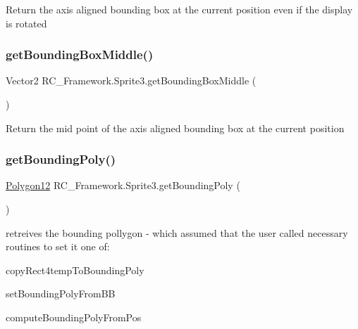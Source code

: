 Return the axis aligned bounding box at the current position even if the display is rotated 

\mbox{\label{class_r_c___framework_1_1_sprite3_a01208614a05673dd6b6d747910394657}} 
\subsubsection{\texorpdfstring{get\+Bounding\+Box\+Middle()}{getBoundingBoxMiddle()}}
{\footnotesize\ttfamily Vector2 R\+C\+\_\+\+Framework.\+Sprite3.\+get\+Bounding\+Box\+Middle (\begin{DoxyParamCaption}{ }\end{DoxyParamCaption})}



Return the mid point of the axis aligned bounding box at the current position 

\mbox{\label{class_r_c___framework_1_1_sprite3_afd66805a5662cad934b912d4b204819d}} 
\subsubsection{\texorpdfstring{get\+Bounding\+Poly()}{getBoundingPoly()}}
{\footnotesize\ttfamily \mbox{\hyperlink{class_r_c___framework_1_1_polygon12}{Polygon12}} R\+C\+\_\+\+Framework.\+Sprite3.\+get\+Bounding\+Poly (\begin{DoxyParamCaption}{ }\end{DoxyParamCaption})}



retreives the bounding pollygon -\/ which assumed that the user called necessary routines to set it one of\+: 


\begin{DoxyItemize}
\item copy\+Rect4temp\+To\+Bounding\+Poly
\item set\+Bounding\+Poly\+From\+BB
\item compute\+Bounding\+Poly\+From\+Pos 
\end{DoxyItemize}

